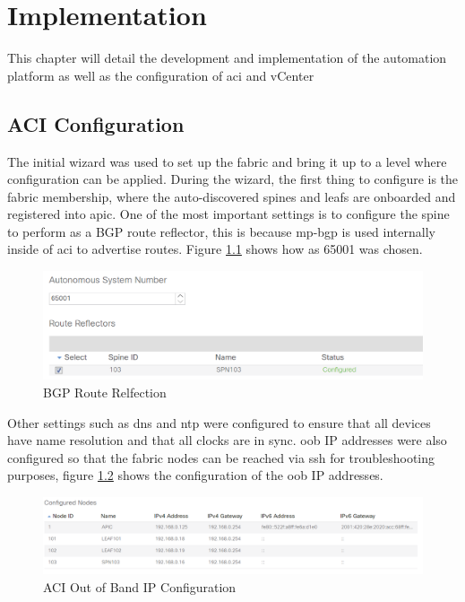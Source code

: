\chapter{Implementation}
\label{chap:implementation}
This chapter will detail the development and implementation of the automation
platform as well as the configuration of \gls{aci} and vCenter
\section{ACI Configuration}
The initial wizard was used to set up the fabric and bring it up to a level
where configuration can be applied. During the wizard, the first thing to
configure is the fabric membership, where the auto-discovered spines and leafs
are onboarded and registered into \gls{apic}.
One of the most important settings is to configure the spine to perform as a
BGP route reflector, this is because \gls{mp-bgp} is used internally inside of
\gls{aci} to advertise routes. Figure \ref{fig:bgp-reflection} shows how
\gls{as} 65001 was chosen.

\begin{figure}[H]
    
    \centering
    \includegraphics[scale=0.5]{images/bgp-reflection.png}
    
    \caption{BGP Route Relfection}
    \label{fig:bgp-reflection}
\end{figure}

Other settings such as \gls{dns} and \gls{ntp} were configured to ensure that
all devices have name resolution and that all clocks are in sync.
\gls{oob} IP addresses were also configured so that the fabric nodes can be
reached via \gls{ssh} for troubleshooting purposes, figure \ref{fig:aci-oob-ip}
shows the configuration of the \gls{oob} IP addresses.

\begin{figure}[H]
    
    \centering
    \includegraphics[scale=0.5]{images/aci-oob-ip.png}
    
    \caption{ACI Out of Band IP Configuration}
    \label{fig:aci-oob-ip}
\end{figure}

